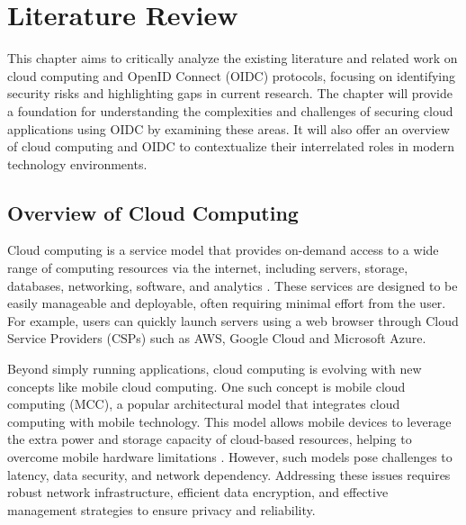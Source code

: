 \chapter{Literature Review}

This chapter aims to critically analyze the existing literature and related work on cloud computing and OpenID Connect (OIDC) protocols, focusing on identifying security risks and highlighting gaps in current research. The chapter will provide a foundation for understanding the complexities and challenges of securing cloud applications using OIDC by examining these areas. It will also offer an overview of cloud computing and OIDC to contextualize their interrelated roles in modern technology environments.

\section{Overview of Cloud Computing}
Cloud computing is a service model that provides on-demand access to a wide range of computing resources via the internet, including servers, storage, databases, networking, software, and analytics \citep{rashid2019cloud}. These services are designed to be easily manageable and deployable, often requiring minimal effort from the user. For example, users can quickly launch servers using a web browser through Cloud Service Providers (CSPs) such as AWS, Google Cloud and Microsoft Azure. 

Beyond simply running applications, cloud computing is evolving with new concepts like mobile cloud computing. One such concept is mobile cloud computing (MCC), a popular architectural model that integrates cloud computing with mobile technology. This model allows mobile devices to leverage the extra power and storage capacity of cloud-based resources, helping to overcome mobile hardware limitations \citep{mcc}. However, such models pose challenges to latency, data security, and network dependency. Addressing these issues requires robust network infrastructure, efficient data encryption, and effective management strategies to ensure privacy and reliability.

